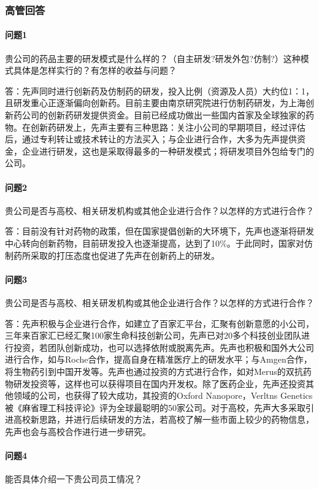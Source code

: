 \documentclass[twocolumn]{ctexbook}
\begin{document}
	\subsubsection*{高管回答}
	
	\paragraph{问题1}贵公司的药品主要的研发模式是什么样的？（自主研发?研发外包?仿制?）这种模式具体是怎样实行的？有怎样的收益与问题？
	
	答：先声同时进行创新药及仿制药的研发，投入比例（资源及人员）大约位1：1，且研发重心正逐渐偏向创新药。目前主要由南京研究院进行仿制药研发，为上海创新药公司的创新药研发提供资金。目前已经成功做出一些国内首家及全球独家的药物。在创新药研发上，先声主要有三种思路：关注小公司的早期项目，经过评估后，通过专利转让或技术转让的方法买入；与企业进行合作，大多为先声提供资金，企业进行研发，这也是采取得最多的一种研发模式；将研发项目外包给专门的公司。
	
	\paragraph{问题2}贵公司是否与高校、相关研发机构或其他企业进行合作？以怎样的方式进行合作？
	
	答：目前没有针对药物的政策，但在国家提倡创新的大环境下，先声也逐渐将研发中心转向创新药物，目前研发投入也逐渐提高，达到了10\%。于此同时，国家对仿制药所采取的打压态度也促进了先声在创新药上的研发。
	
	\paragraph{问题3}贵公司是否与高校、相关研发机构或其他企业进行合作？以怎样的方式进行合作？
	
	答：先声积极与企业进行合作，如建立了百家汇平台，汇聚有创新意愿的小公司，三年来百家汇已经汇聚100家生命科技创新公司，先声已对20多个科技创业团队进行投资，若团队创新成功，也可以选择依附或脱离先声。先声也积极和国外大公司进行合作，如与Roche合作，提高自身在精准医疗上的研发水平；与Amgen合作，将生物药引到中国开发等。先声也通过投资的方式进行合作，如对Merus的双抗药物研发投资等，这样也可以获得项目在国内开发权。除了医药企业，先声还投资其他领域的公司，也获得了较大成功，其投资的Oxford Nanopore，Verltns Genetics被《麻省理工科技评论》评为全球最聪明的50家公司。对于高校，先声大多采取引进高校新思路，并进行后续研发的方法，若高校了解一些市面上较少的药物信息，先声也会与高校合作进行进一步研究。
	
	\paragraph{问题4}能否具体介绍一下贵公司员工情况？
	
\end{document}
